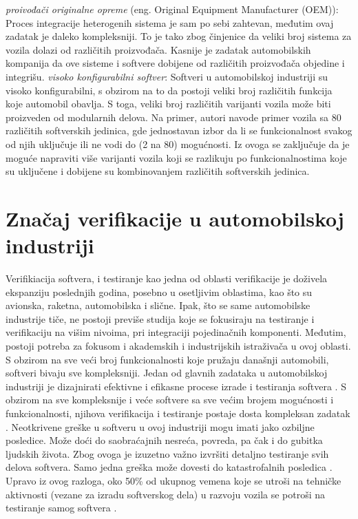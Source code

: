 \documentclass[a4paper]{article}
\begin{document}
\bigbreak
\textit{proivođači originalne opreme} (eng. Original Equipment Manufacturer (OEM)): Proces integracije heterogenih sistema je sam po sebi zahtevan, međutim ovaj zadatak je daleko kompleksniji. To je tako zbog činjenice da veliki broj sistema za vozila dolazi od različitih proizvođača. Kasnije je zadatak automobilskih kompanija da ove sisteme i softvere dobijene od različitih proizvođača objedine i integrišu.
\bigbreak
\textit{visoko konfigurabilni softver}: Softveri u automobilskoj industriji su visoko konfigurabilni, s obzirom na to da postoji veliki broj različitih funkcija koje automobil obavlja. S toga, veliki broj različitih varijanti vozila može biti proizveden od modularnih delova. Na primer, autori \cite{ref7} navode primer vozila sa 80 različitih softverskih jedinica, gde jednostavan izbor da li se funkcionalnost svakog od njih uključuje ili ne vodi do (2 na 80) mogućnosti. Iz ovoga se zaključuje da je moguće napraviti više varijanti vozila koji se razlikuju po funkcionalnostima koje su uključene i dobijene su kombinovanjem različitih softverskih jedinica.
\bigbreak
\section{Značaj verifikacije u automobilskoj industriji}
\label{sec:znacajverifkacije}

Verifikiacija softvera, i testiranje kao jedna od oblasti verifikacije je doživela ekspanziju poslednjih godina, posebno u osetljivim oblastima, kao što su avionska, raketna, automobilska i slične. Ipak, što se same automobilske industrije tiče, ne postoji previše studija koje se fokusiraju na testiranje i verifikaciju na višim nivoima, pri integraciji pojedinačnih komponenti. Međutim, postoji potreba za fokusom i akademskih i industrijskih istraživača u ovoj oblasti.
\bigbreak
S obzirom na sve veći broj funkcionalnosti koje pružaju današnji automobili, softveri bivaju sve kompleksniji. Jedan od glavnih zadataka u automobilskoj industriji je dizajnirati efektivne i efikasne procese izrade i testiranja softvera \cite{ref9}. S obzirom na sve kompleksnije i veće softvere sa sve većim brojem mogućnosti i funkcionalnosti, njihova verifikacija i testiranje postaje dosta kompleksan zadatak \cite{ref10}. Neotkrivene greške u softveru u ovoj industriji mogu imati jako ozbiljne posledice. Može doći do saobraćajnih nesreća, povreda, pa čak i do gubitka ljudskih života. Zbog ovoga je izuzetno važno izvršiti detaljno testiranje svih delova softvera. Samo jedna greška može dovesti do katastrofalnih posledica \cite{ref11}. Upravo iz ovog razloga, oko 50\% od ukupnog vemena koje se utroši na tehničke aktivnosti (vezane za izradu softverskog dela) u razvoju vozila se potroši na testiranje samog softvera \cite{ref12}.
\end{document}
